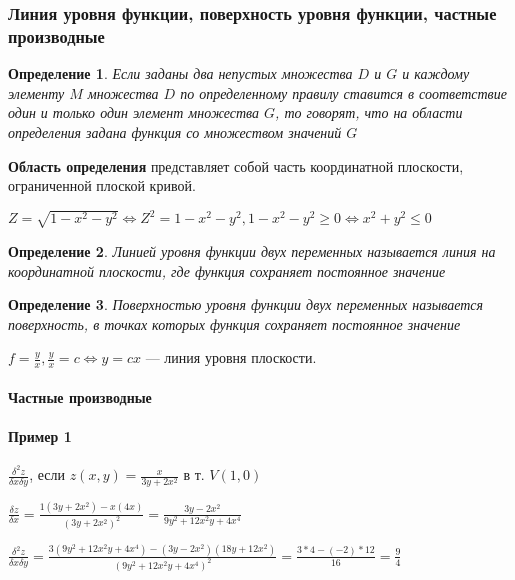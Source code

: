\documentclass{article}
\newtheorem{definition}{Определение}
\begin{document}
\subsubsection{Линия уровня функции, поверхность уровня функции, частные производные}

\begin{definition}
Если заданы два непустых множества $D$ и $G$ и каждому элементу $M$ множества $D$ по определенному правилу ставится в соответствие один и только один элемент множества $G$, то говорят, что на области определения задана функция со множеством значений $G$
\end{definition}

\textbf{Область определения} представляет собой часть координатной плоскости, ограниченной плоской кривой.

\hfill

$Z = \sqrt{1 - x^2 - y^2} \Longleftrightarrow Z^{2} = 1 - x^2 - y^2, 1 - x^2 - y^2 \ge 0 \Longleftrightarrow x^2 + y^2 \le 0$

\begin{definition}
    Линией уровня функции двух переменных называется линия на координатной плоскости, где функция сохраняет постоянное значение
\end{definition}

\begin{definition}
    Поверхностью уровня функции двух переменных называется поверхность, в точках которых функция сохраняет постоянное значение
\end{definition}

$f = \frac{y}{x}, \frac{y}{x} = c \Longleftrightarrow y = cx$ — линия уровня плоскости.

\paragraph{Частные производные}

\paragraph{Пример 1}

\hfill

\hfill

$\frac{\delta^2 z}{\delta x \delta y}$, если $z(x, y) = \frac{x}{3y + 2x^2}$ в т. $V(1, 0)$

$\frac{\delta z}{\delta x} = \frac{1(3y + 2x^2) - x(4x)}{(3y + 2x^2)^2} = \frac{3y - 2x^2}{9y^2 + 12x^2 y + 4x^4}$

$\frac{\delta^2 z}{\delta x \delta y} = \frac{3(9y^2 + 12x^2 y + 4x^4) - (3y - 2x^2)(18y + 12x^2)}{(9y^2 + 12x^2 y + 4x^4)^2} = \frac{3 * 4 - (-2) * 12}{16} = \frac{9}{4}$
\end{document}

